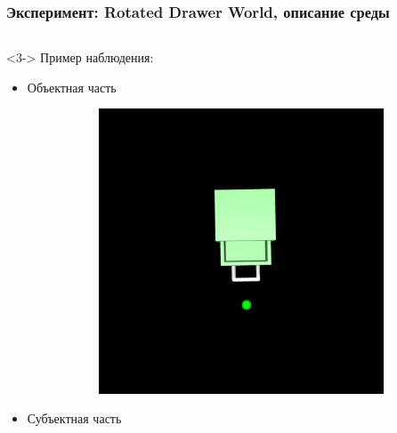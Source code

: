 \begin{frame}
\frametitle{Эксперимент: Rotated Drawer World, описание среды}

\begin{columns}[t]
\begin{column}{0.33\linewidth}<3->
    Пример наблюдения:
    \begin{itemize}
        \item<4-> Объектная часть
            \begin{figure}
            \begin{subfigure}{0.8\linewidth}
                \centering
                  \includegraphics[width=\linewidth]{images/env/rotated_drawer/masked_obj.png}
            \end{subfigure}
            \end{figure}
        \item<5-> Субъектная часть
            \begin{figure}

\end{figure}
\end{itemize}
\end{column}
\end{columns}
\end{frame}
